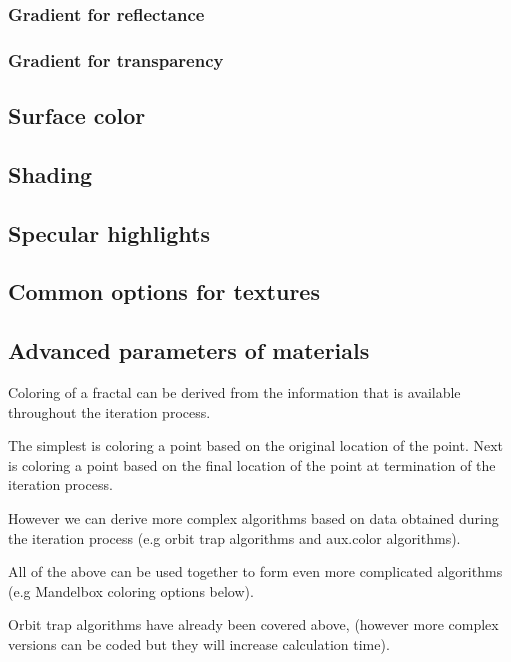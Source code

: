 \subsubsection{Gradient for reflectance}\label{materials-reflectance-gradient}

\subsubsection{Gradient for transparency}\label{materials-transparency-gradient}

\subsection{Surface color}\label{materials-surface_color}

\subsection{Shading}\label{materials-shading}

\subsection{Specular highlights}\label{materials-specular}

\subsection{Common options for textures}\label{materials-textures}

\subsection{Advanced parameters of materials}\label{materials-advanced}

Coloring of a fractal can be derived from the information that is available throughout the iteration process.

The simplest is coloring a point based on the original location of the point.
Next is coloring a point based on the final location of the point at termination of the iteration process.

However we can derive more complex algorithms based on data obtained during the iteration process (e.g orbit trap algorithms and aux.color algorithms).

All of the above can be used together to form even more complicated algorithms (e.g Mandelbox coloring options below).

Orbit trap algorithms have already been covered above, (however more complex versions can be coded but they will increase calculation time).


